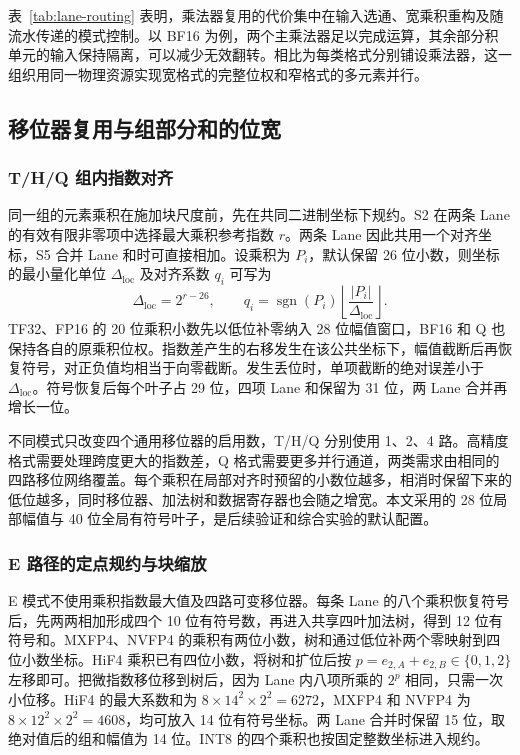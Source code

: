 \documentclass[10.5pt,compsoc,UTF8]{CjC}
\begin{document}
表~\ref{tab:lane-routing} 表明，乘法器复用的代价集中在输入选通、宽乘积重构及随流水传递的模式控制。以 BF16 为例，两个主乘法器足以完成运算，其余部分积单元的输入保持隔离，可以减少无效翻转。相比为每类格式分别铺设乘法器，这一组织用同一物理资源实现宽格式的完整位权和窄格式的多元素并行。

\subsection{移位器复用与组部分和的位宽}

\subsubsection{T/H/Q 组内指数对齐}

同一组的元素乘积在施加块尺度前，先在共同二进制坐标下规约。S2 在两条 Lane 的有效有限非零项中选择最大乘积参考指数 $r$。两条 Lane 因此共用一个对齐坐标，S5 合并 Lane 和时可直接相加。设乘积为 $P_i$，默认保留 26 位小数，则坐标的最小量化单位 $\Delta_{\mathrm{loc}}$ 及对齐系数 $q_i$ 可写为
\begin{equation}
  \Delta_{\mathrm{loc}}=2^{r-26},\qquad
  q_i=\operatorname{sgn}(P_i)\left\lfloor
                  \frac{|P_i|}{\Delta_{\mathrm{loc}}}\right\rfloor .
  \label{eq:local-align}
\end{equation}
TF32、FP16 的 20 位乘积小数先以低位补零纳入 28 位幅值窗口，BF16 和 Q 也保持各自的原乘积位权。指数差产生的右移发生在该公共坐标下，幅值截断后再恢复符号，对正负值均相当于向零截断。发生丢位时，单项截断的绝对误差小于 $\Delta_{\mathrm{loc}}$。符号恢复后每个叶子占 29 位，四项 Lane 和保留为 31 位，两 Lane 合并再增长一位。

不同模式只改变四个通用移位器的启用数，T/H/Q 分别使用 1、2、4 路。高精度格式需要处理跨度更大的指数差，Q 格式需要更多并行通道，两类需求由相同的四路移位网络覆盖。每个乘积在局部对齐时预留的小数位越多，相消时保留下来的低位越多，同时移位器、加法树和数据寄存器也会随之增宽。本文采用的 28 位局部幅值与 40 位全局有符号叶子，是后续验证和综合实验的默认配置。

\subsubsection{E 路径的定点规约与块缩放}

E 模式不使用乘积指数最大值及四路可变移位器。每条 Lane 的八个乘积恢复符号后，先两两相加形成四个 10 位有符号数，再进入共享四叶加法树，得到 12 位有符号和。MXFP4、NVFP4 的乘积有两位小数，树和通过低位补两个零映射到四位小数坐标。HiF4 乘积已有四位小数，将树和扩位后按 $p=e_{2,A}+e_{2,B}\in\{0,1,2\}$ 左移即可。把微指数移位移到树后，因为 Lane 内八项所乘的 $2^p$ 相同，只需一次小位移。HiF4 的最大系数和为 $8\times14^2\times 2^2=6272$，MXFP4 和 NVFP4 为 $8\times12^2\times2^2=4608$，均可放入 14 位有符号坐标。两 Lane 合并时保留 15 位，取绝对值后的组和幅值为 14 位。INT8 的四个乘积也按固定整数坐标进入规约。
\end{document}
